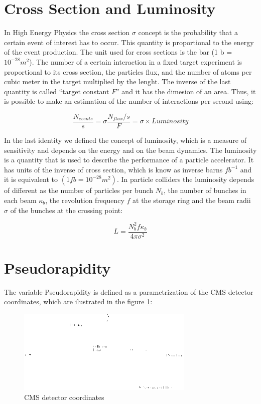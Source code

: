  \section{Cross Section and Luminosity}
 
 In High Energy Physics the cross section $\sigma$ concept is the probability that a certain event of interest has to occur. This quantity is proportional to the energy of the event production. The unit 
 used for cross sections is the bar (1 b = $10^{-28} m^2$). The number of a certain interaction in a fixed target experiment is proportional to its cross section, the particles flux, and the
 number of atoms per cubic meter in the target multiplied by the lenght. The inverse of the last quantity is called ``target constant $F$'' and it has the dimesion of an area. Thus, it is possible
 to make an estimation of the number of interactions per second using:
 
 \begin{equation}
  \frac{N_{events}}{s} = \sigma \frac{N_{flux}/s}{F} = \sigma \times Luminosity
 \end{equation}

 In the last identity we defined the concept of luminosity, which is a measure of sensitivity and depends on the energy and on the beam dynamics.  The luminosity is a quantity that is used to 
 describe the performance of a particle accelerator. It has units of the inverse of cross section, which is know as inverse barns $fb^{-1}$ and it is equivalent to $(1 fb = 10^{-28} m^2)$. 
 In particle colliders the 
 luminosity depends of different as the number of particles per bunch $N_b$, the number of bunches in each beam $\kappa_b$, the revolution frequency $f$ at the storage ring and the beam radii 
 $ \sigma$ of the bunches at the crossing point:
 
 \begin{equation}
  L = \frac{N_b^2 f \kappa_b}{4\pi \sigma^2} 
 \end{equation}

 \section{Pseudorapidity}
 
 The variable Pseudorapidity is defined as a parametrization of the CMS detector coordinates, which are ilustrated in the figure \ref{CMSCoordinates}:
 
 
 \begin{figure}[h] \label{CMSCoordinates}
 \includegraphics[width=0.75\textwidth]{./Capitulos/VariableDefinitions/CMS_coordinates}  
  \caption{CMS detector coordinates}
 \end{figure}


